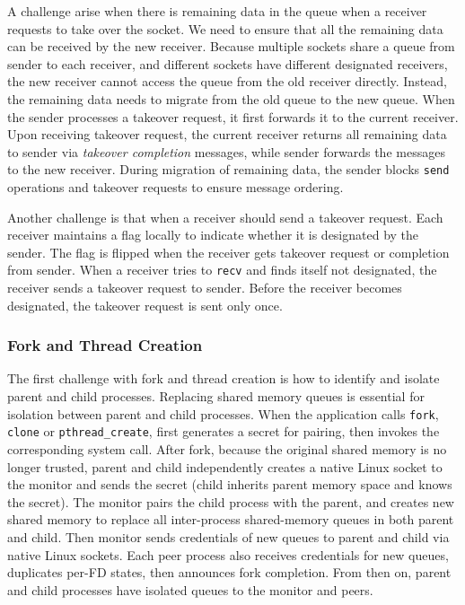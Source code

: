 A challenge arise when there is remaining data in the queue when a receiver requests to take over the socket. We need to ensure that all the remaining data can be received by the new receiver. Because multiple sockets share a queue from sender to each receiver, and different sockets have different designated receivers, the new receiver cannot access the queue from the old receiver directly. Instead, the remaining data needs to migrate from the old queue to the new queue. When the sender processes a takeover request, it first forwards it to the current receiver. Upon receiving takeover request, the current receiver returns all remaining data to sender via \textit{takeover completion} messages, while sender forwards the messages to the new receiver. During migration of remaining data, the sender blocks \texttt{send} operations and takeover requests to ensure message ordering.

Another challenge is that when a receiver should send a takeover request. Each receiver maintains a flag locally to indicate whether it is designated by the sender. The flag is flipped when the receiver gets takeover request or completion from sender. When a receiver tries to \texttt{recv} and finds itself not designated, the receiver sends a takeover request to sender. Before the receiver becomes designated, the takeover request is sent only once.


\subsubsection{Fork and Thread Creation}
\label{subsubsec:fork_fork}

The first challenge with fork and thread creation is how to identify and isolate parent and child processes. Replacing shared memory queues is essential for isolation between parent and child processes. When the application calls \texttt{fork}, \texttt{clone} or \texttt{pthread\_create}, \libipc{} first generates a secret for pairing, then invokes the corresponding system call. After fork, because the original shared memory is no longer trusted, parent and child independently creates a native Linux socket to the monitor and sends the secret (child inherits parent memory space and knows the secret). The monitor pairs the child process with the parent, and creates new shared memory to replace all inter-process shared-memory queues in both parent and child. Then monitor sends credentials of new queues to parent and child via native Linux sockets. Each peer process also receives credentials for new queues, duplicates per-FD states, then announces fork completion. From then on, parent and child processes have isolated queues to the monitor and peers.

